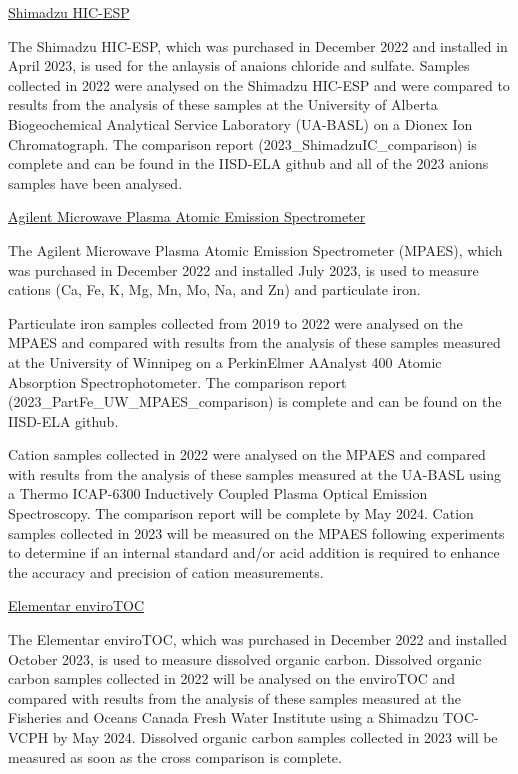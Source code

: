 \documentclass[
]{article}
\begin{document}
\underline{Shimadzu HIC-ESP}

The Shimadzu HIC-ESP, which was purchased in December 2022 and installed
in April 2023, is used for the anlaysis of anaions chloride and sulfate.
Samples collected in 2022 were analysed on the Shimadzu HIC-ESP and were
compared to results from the analysis of these samples at the University
of Alberta Biogeochemical Analytical Service Laboratory (UA-BASL) on a
Dionex Ion Chromatograph. The comparison report
(2023\_ShimadzuIC\_comparison) is complete and can be found in the
IISD-ELA github and all of the 2023 anions samples have been analysed.

\underline{Agilent Microwave Plasma Atomic Emission Spectrometer}

The Agilent Microwave Plasma Atomic Emission Spectrometer (MPAES), which
was purchased in December 2022 and installed July 2023, is used to
measure cations (Ca, Fe, K, Mg, Mn, Mo, Na, and Zn) and particulate
iron.

Particulate iron samples collected from 2019 to 2022 were analysed on
the MPAES and compared with results from the analysis of these samples
measured at the University of Winnipeg on a PerkinElmer AAnalyst 400
Atomic Absorption Spectrophotometer. The comparison report
(2023\_PartFe\_UW\_MPAES\_comparison) is complete and can be found on
the IISD-ELA github.

Cation samples collected in 2022 were analysed on the MPAES and compared
with results from the analysis of these samples measured at the UA-BASL
using a Thermo ICAP-6300 Inductively Coupled Plasma Optical Emission
Spectroscopy. The comparison report will be complete by May 2024. Cation
samples collected in 2023 will be measured on the MPAES following
experiments to determine if an internal standard and/or acid addition is
required to enhance the accuracy and precision of cation measurements.

\pagebreak

\underline{Elementar enviroTOC}

The Elementar enviroTOC, which was purchased in December 2022 and
installed October 2023, is used to measure dissolved organic carbon.
Dissolved organic carbon samples collected in 2022 will be analysed on
the enviroTOC and compared with results from the analysis of these
samples measured at the Fisheries and Oceans Canada Fresh Water
Institute using a Shimadzu TOC-VCPH by May 2024. Dissolved organic
carbon samples collected in 2023 will be measured as soon as the cross
comparison is complete.
\end{document}
